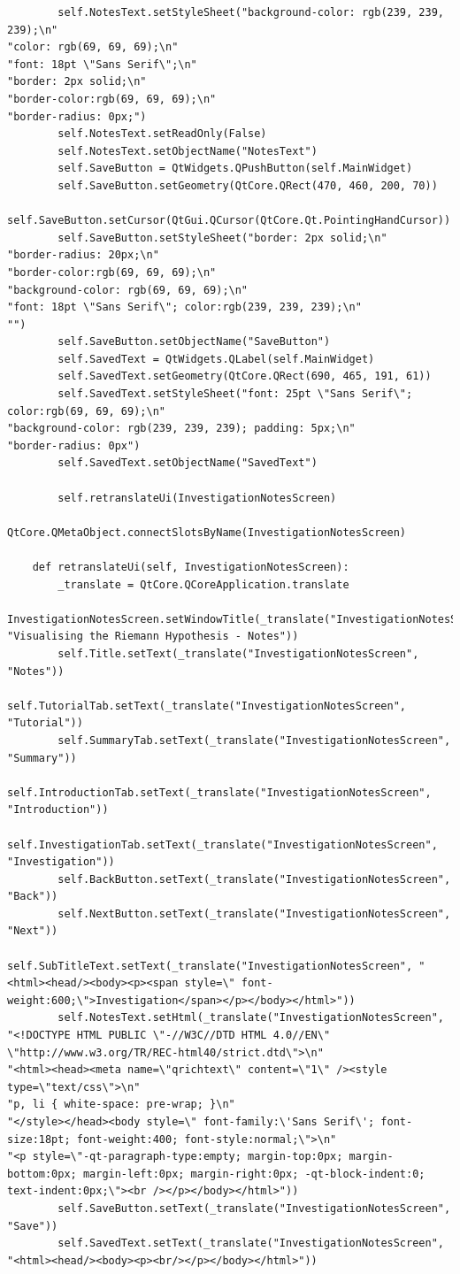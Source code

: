 \documentclass{article}
\begin{document}
\begin{lstlisting}
        self.NotesText.setStyleSheet("background-color: rgb(239, 239, 239);\n"
"color: rgb(69, 69, 69);\n"
"font: 18pt \"Sans Serif\";\n"
"border: 2px solid;\n"
"border-color:rgb(69, 69, 69);\n"
"border-radius: 0px;")
        self.NotesText.setReadOnly(False)
        self.NotesText.setObjectName("NotesText")
        self.SaveButton = QtWidgets.QPushButton(self.MainWidget)
        self.SaveButton.setGeometry(QtCore.QRect(470, 460, 200, 70))
        self.SaveButton.setCursor(QtGui.QCursor(QtCore.Qt.PointingHandCursor))
        self.SaveButton.setStyleSheet("border: 2px solid;\n"
"border-radius: 20px;\n"
"border-color:rgb(69, 69, 69);\n"
"background-color: rgb(69, 69, 69);\n"
"font: 18pt \"Sans Serif\"; color:rgb(239, 239, 239);\n"
"")
        self.SaveButton.setObjectName("SaveButton")
        self.SavedText = QtWidgets.QLabel(self.MainWidget)
        self.SavedText.setGeometry(QtCore.QRect(690, 465, 191, 61))
        self.SavedText.setStyleSheet("font: 25pt \"Sans Serif\"; color:rgb(69, 69, 69);\n"
"background-color: rgb(239, 239, 239); padding: 5px;\n"
"border-radius: 0px")
        self.SavedText.setObjectName("SavedText")

        self.retranslateUi(InvestigationNotesScreen)
        QtCore.QMetaObject.connectSlotsByName(InvestigationNotesScreen)

    def retranslateUi(self, InvestigationNotesScreen):
        _translate = QtCore.QCoreApplication.translate
        InvestigationNotesScreen.setWindowTitle(_translate("InvestigationNotesScreen", "Visualising the Riemann Hypothesis - Notes"))
        self.Title.setText(_translate("InvestigationNotesScreen", "Notes"))
        self.TutorialTab.setText(_translate("InvestigationNotesScreen", "Tutorial"))
        self.SummaryTab.setText(_translate("InvestigationNotesScreen", "Summary"))
        self.IntroductionTab.setText(_translate("InvestigationNotesScreen", "Introduction"))
        self.InvestigationTab.setText(_translate("InvestigationNotesScreen", "Investigation"))
        self.BackButton.setText(_translate("InvestigationNotesScreen", "Back"))
        self.NextButton.setText(_translate("InvestigationNotesScreen", "Next"))
        self.SubTitleText.setText(_translate("InvestigationNotesScreen", "<html><head/><body><p><span style=\" font-weight:600;\">Investigation</span></p></body></html>"))
        self.NotesText.setHtml(_translate("InvestigationNotesScreen", "<!DOCTYPE HTML PUBLIC \"-//W3C//DTD HTML 4.0//EN\" \"http://www.w3.org/TR/REC-html40/strict.dtd\">\n"
"<html><head><meta name=\"qrichtext\" content=\"1\" /><style type=\"text/css\">\n"
"p, li { white-space: pre-wrap; }\n"
"</style></head><body style=\" font-family:\'Sans Serif\'; font-size:18pt; font-weight:400; font-style:normal;\">\n"
"<p style=\"-qt-paragraph-type:empty; margin-top:0px; margin-bottom:0px; margin-left:0px; margin-right:0px; -qt-block-indent:0; text-indent:0px;\"><br /></p></body></html>"))
        self.SaveButton.setText(_translate("InvestigationNotesScreen", "Save"))
        self.SavedText.setText(_translate("InvestigationNotesScreen", "<html><head/><body><p><br/></p></body></html>"))
\end{lstlisting}
\end{document}
